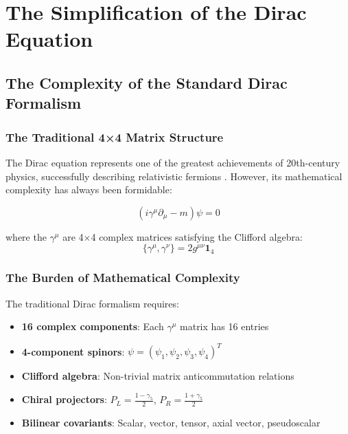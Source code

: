 \documentclass[12pt,a4paper]{report}
\begin{document}
\chapter{The Simplification of the Dirac Equation}
\label{chap:dirac_simplification}

\section{The Complexity of the Standard Dirac Formalism}
\label{sec:dirac_complexity}

\subsection{The Traditional 4×4 Matrix Structure}
\label{subsec:traditional_matrices}

The Dirac equation represents one of the greatest achievements of 20th-century physics, successfully describing relativistic fermions \cite{dirac_original_1928}. However, its mathematical complexity has always been formidable:

\begin{equation}
	(i\gamma^\mu \partial_\mu - m)\psi = 0
	\label{eq:dirac_traditional}
\end{equation}

where the $\gamma^\mu$ are 4×4 complex matrices satisfying the Clifford algebra:
\begin{equation}
	\{\gamma^\mu, \gamma^\nu\} = 2g^{\mu\nu} \mathbf{1}_4
	\label{eq:clifford_algebra}
\end{equation}

\subsection{The Burden of Mathematical Complexity}
\label{subsec:mathematical_burden}

The traditional Dirac formalism requires:
\begin{itemize}
	\item \textbf{16 complex components}: Each $\gamma^\mu$ matrix has 16 entries
	\item \textbf{4-component spinors}: $\psi = (\psi_1, \psi_2, \psi_3, \psi_4)^T$
	\item \textbf{Clifford algebra}: Non-trivial matrix anticommutation relations
	\item \textbf{Chiral projectors}: $P_L = \frac{1-\gamma_5}{2}$, $P_R = \frac{1+\gamma_5}{2}$
	\item \textbf{Bilinear covariants}: Scalar, vector, tensor, axial vector, pseudoscalar
\end{itemize}
\end{document}
